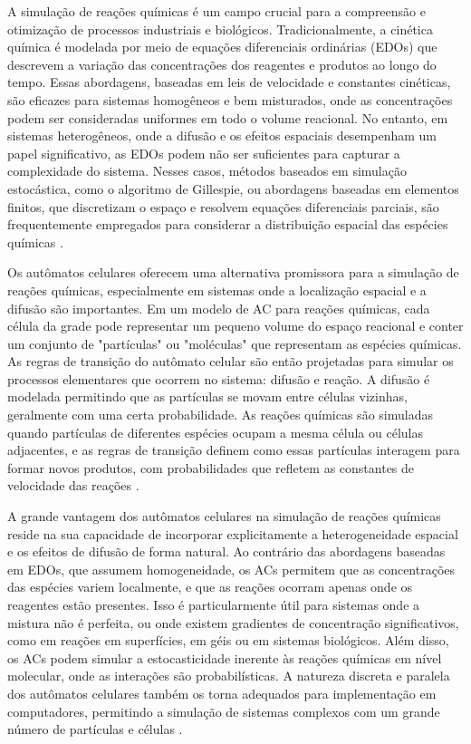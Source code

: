 \documentclass[12pt,oneside]{report}
\begin{document}
A simulação de reações químicas é um campo crucial para a compreensão e otimização de processos industriais e biológicos. Tradicionalmente, a cinética química é modelada por meio de equações diferenciais ordinárias (EDOs) que descrevem a variação das concentrações dos reagentes e produtos ao longo do tempo. Essas abordagens, baseadas em leis de velocidade e constantes cinéticas, são eficazes para sistemas homogêneos e bem misturados, onde as concentrações podem ser consideradas uniformes em todo o volume reacional. No entanto, em sistemas heterogêneos, onde a difusão e os efeitos espaciais desempenham um papel significativo, as EDOs podem não ser suficientes para capturar a complexidade do sistema. Nesses casos, métodos baseados em simulação estocástica, como o algoritmo de Gillespie, ou abordagens baseadas em elementos finitos, que discretizam o espaço e resolvem equações diferenciais parciais, são frequentemente empregados para considerar a distribuição espacial das espécies químicas \cite{Gillespie1977}.

Os autômatos celulares oferecem uma alternativa promissora para a simulação de reações químicas, especialmente em sistemas onde a localização espacial e a difusão são importantes. Em um modelo de AC para reações químicas, cada célula da grade pode representar um pequeno volume do espaço reacional e conter um conjunto de "partículas" ou "moléculas" que representam as espécies químicas. As regras de transição do autômato celular são então projetadas para simular os processos elementares que ocorrem no sistema: difusão e reação. A difusão é modelada permitindo que as partículas se movam entre células vizinhas, geralmente com uma certa probabilidade. As reações químicas são simuladas quando partículas de diferentes espécies ocupam a mesma célula ou células adjacentes, e as regras de transição definem como essas partículas interagem para formar novos produtos, com probabilidades que refletem as constantes de velocidade das reações \cite{kier2005}.

A grande vantagem dos autômatos celulares na simulação de reações químicas reside na sua capacidade de incorporar explicitamente a heterogeneidade espacial e os efeitos de difusão de forma natural. Ao contrário das abordagens baseadas em EDOs, que assumem homogeneidade, os ACs permitem que as concentrações das espécies variem localmente, e que as reações ocorram apenas onde os reagentes estão presentes. Isso é particularmente útil para sistemas onde a mistura não é perfeita, ou onde existem gradientes de concentração significativos, como em reações em superfícies, em géis ou em sistemas biológicos. Além disso, os ACs podem simular a estocasticidade inerente às reações químicas em nível molecular, onde as interações são probabilísticas. A natureza discreta e paralela dos autômatos celulares também os torna adequados para implementação em computadores, permitindo a simulação de sistemas complexos com um grande número de partículas e células \cite{kier2005}.
\end{document}
